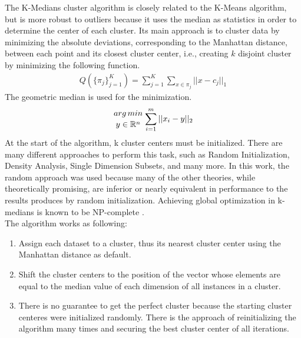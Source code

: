 The K-Medians cluster algorithm is closely related to the K-Means algorithm, but is more robust to outliers because it uses the median as statistics in order to determine the center of each cluster. Its main approach is to cluster data by minimizing the absolute deviations, corresponding to the Manhattan distance, between each point and its closest cluster center, i.e., creating $k$ disjoint cluster by minimizing the following function. \cite{kmed}
\begin{align}
    Q(\{\pi_j\}^K_{j=1}) = \sum_{j=1}^{K}\sum_{x \in \pi_j}||x-c_j||_1
\end{align}
The geometric median is used for the minimization.
\begin{align}
    {{arg\, min}\atop{y\in\mathbb{R}^n}} \sum_{i=1}^m ||x_i-y||_2
\end{align}
At the start of the algorithm, k cluster centers must be initialized. There are many different approaches to perform this task, such as Random Initialization, Density Analysis, Single Dimension Subsets, and many more. In this work, the random approach was used because many of the other theories, while theoretically promising, are inferior or nearly equivalent in performance to the results produces by random initialization. \cite{kmed} Achieving global optimization in k-medians is known to be NP-complete \cite{kmed_time}.\\ 
The algorithm works as following:\cite{algo_kmed}
\begin{enumerate}
    \item Assign each dataset to a cluster, thus its nearest cluster center using the Manhattan distance as default.
    \item Shift the cluster centers to the position of the vector whose elements are equal to the median value of each dimension of all instances in a cluster.
    \item There is no guarantee to get the perfect cluster because the starting cluster centeres were initialized randomly. There is the approach of reinitializing the algorithm many times and securing the best cluster center of all iterations.
\end{enumerate}